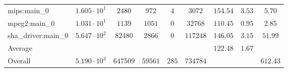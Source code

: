 \begin{tabular}{|l|c|c|c|c|c|c|c|c|}
mips:main\_0            & $ 1.605 \cdot 10^{1}  $ & $ 2480   $ & $ 972   $ & $ 4   $ & $ 3072   $ & $ 154.54      $ & $ 3.53    $ & $ 5.70    $ \\
mpeg2:main\_0           & $ 1.031 \cdot 10^{1}  $ & $ 1139   $ & $ 1051  $ & $ 0   $ & $ 32768  $ & $ 110.45      $ & $ 0.95    $ & $ 2.85    $ \\
sha\_driver:main\_0     & $ 5.647 \cdot 10^{2}  $ & $ 82480  $ & $ 2866  $ & $ 0   $ & $ 117248 $ & $ 146.05      $ & $ 3.15    $ & $ 51.99   $ \\
\hline
Average                 & $                     $ & $        $ & $       $ & $     $ & $        $ & $ 122.48      $ & $ 1.67    $ & $         $ \\
\hline
Overall                 & $ 5.190 \cdot 10^{3}  $ & $ 647509 $ & $ 59561 $ & $ 285 $ & $ 734784 $ & $             $ & $         $ & $ 612.43  $ \\
\hline
\end{tabular}
